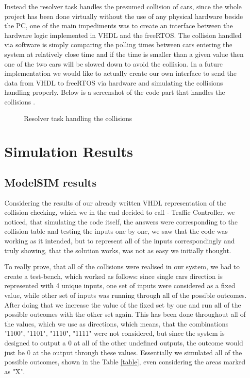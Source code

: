 \documentclass[conference]{IEEEtran}
\begin{document}
Instead the resolver task handles the presumed collision of cars, since the whole project has been done virtually without the use of any physical hardware beside the PC, one of the main impediments was to create an interface between the hardware logic implemented in VHDL and the freeRTOS. The collision handled via software is simply comparing the polling times between cars entering the system at relatively close time and if the time is smaller than a given value then one of the two cars will be slowed down to avoid the collision. In a future implementation we would like to actually create our own interface to send the data from VHDL to freeRTOS via hardware and simulating the collisions handling properly. Below is a screenshot of the code part that handles the collisions \cite{b1}\cite{b2}.
\begin{figure}[h]
    \caption{Resolver task handling the collisions}
    \label{resolver}
\end{figure}



\section{Simulation Results}

\subsection{ModelSIM results}

Considering the results of our already written VHDL representation of the collision checking, which we in the end decided to call - Traffic Controller, we noticed, that simulating the code itself, the answers were corresponding to the collision table and testing the inputs one by one, we saw that the code was working as it intended, but to represent all of the inputs correspondingly and truly showing, that the solution works, was not as easy we initially thought.

To really prove, that all of the collisions were realised in our system, we had to create a test-bench, which worked as follows: since single cars direction is represented with 4 unique inputs, one set of inputs were considered as a fixed value, while other set of inputs was running through all of the possible outcomes. After doing that we increase the value of the fixed set by one and run all of the possible outcomes with the other set again. This has been done throughout all of the values, which we use as directions, which means, that the combinations "1100", "1101", "1110", "1111" were not considered, but since the system is designed to output a 0 at all of the other undefined outputs, the outcome would just be 0 at the output through these values. Essentially we simulated all of the possible outcomes, shown in the Table \ref{table}, even considering the areas marked as "X".
\end{document}
